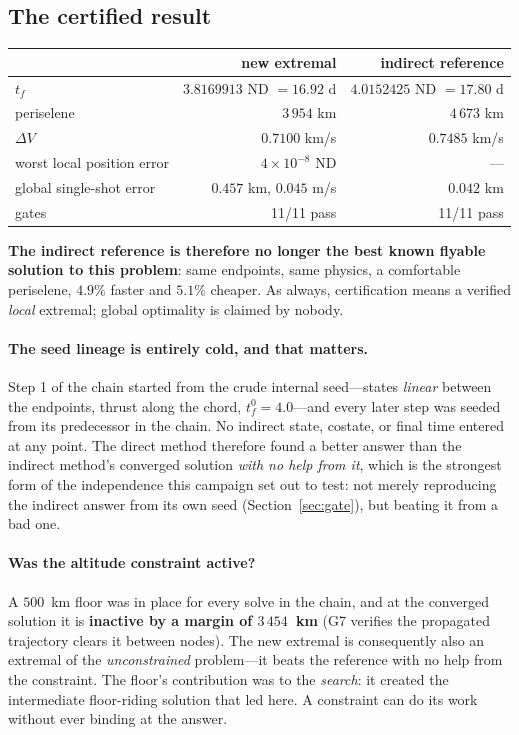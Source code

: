 \documentclass[11pt]{article}
\begin{document}
\subsection{The certified result}

\begin{table}[h]
\centering\small
\begin{tabular}{lrr}
\toprule
 & new extremal & indirect reference \\
\midrule
$t_f$ & $\mathbf{3.8169913}$ ND $= 16.92$ d & $4.0152425$ ND $= 17.80$ d \\
periselene & $3\,954$ km & $4\,673$ km \\
$\Delta V$ & $0.7100$ km/s & $0.7485$ km/s \\
worst local position error & $4\times10^{-8}$ ND & --- \\
global single-shot error & $0.457$ km, $0.045$ m/s & $0.042$ km \\
gates & 11/11 pass & 11/11 pass \\
\bottomrule
\end{tabular}
\end{table}

\noindent\textbf{The indirect reference is therefore no longer the best known
flyable solution to this problem}: same endpoints, same physics, a comfortable
periselene, $4.9\%$ faster and $5.1\%$ cheaper. As always, certification means
a verified \emph{local} extremal; global optimality is claimed by nobody.

\paragraph{The seed lineage is entirely cold, and that matters.} Step 1 of the
chain started from the crude internal seed---states \emph{linear} between the
endpoints, thrust along the chord, $t_f^0 = 4.0$---and every later step was
seeded from its predecessor in the chain. No indirect state, costate, or final
time entered at any point. The direct method therefore found a better answer
than the indirect method's converged solution \emph{with no help from it},
which is the strongest form of the independence this campaign set out to test:
not merely reproducing the indirect answer from its own seed
(Section~\ref{sec:gate}), but beating it from a bad one.

\paragraph{Was the altitude constraint active?} A $500$~km floor was in place
for every solve in the chain, and at the converged solution it is
\textbf{inactive by a margin of $3\,454$~km} (G7 verifies the propagated
trajectory clears it between nodes). The new extremal is consequently also an
extremal of the \emph{unconstrained} problem---it beats the reference with no
help from the constraint. The floor's contribution was to the \emph{search}:
it created the intermediate floor-riding solution that led here. A constraint
can do its work without ever binding at the answer.
\end{document}
